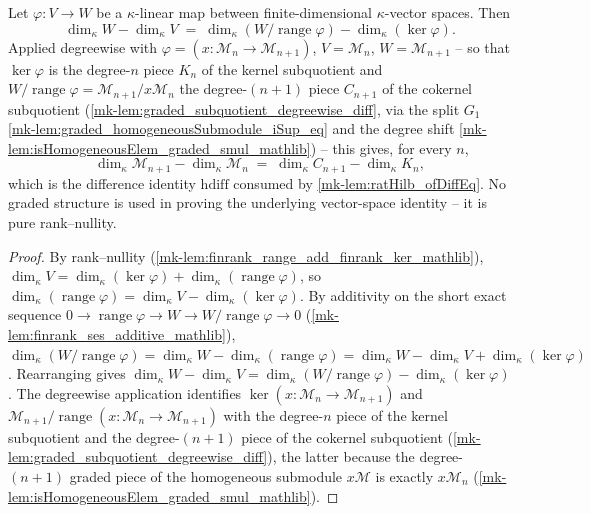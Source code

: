 \begin{lemma}\label{mk-lem:graded_degreewise_finrank_diff}
  \leanok

  Let \(\varphi : V \to W\) be a \(\kappa\)-linear map between finite-dimensional
  \(\kappa\)-vector spaces. Then
  \[
    \dim_\kappa W - \dim_\kappa V
      \;=\; \dim_\kappa(W/\operatorname{range}\varphi) - \dim_\kappa(\ker\varphi).
  \]
  Applied degreewise with \(\varphi = (x : \mathcal{M}_n \to \mathcal{M}_{n+1})\),
  \(V = \mathcal{M}_n\), \(W = \mathcal{M}_{n+1}\) -- so that \(\ker\varphi\) is the
  degree-\(n\) piece \(K_n\) of the kernel subquotient and
  \(W/\operatorname{range}\varphi = \mathcal{M}_{n+1}/x \mathcal{M}_n\) the
  degree-\((n+1)\) piece \(C_{n+1}\) of the cokernel subquotient
  (\ref{mk-lem:graded_subquotient_degreewise_diff}, via the split \(G_1\)
  \ref{mk-lem:graded_homogeneousSubmodule_iSup_eq} and the degree shift
  \ref{mk-lem:isHomogeneousElem_graded_smul_mathlib}) -- this gives, for every \(n\),
  \[
    \dim_\kappa \mathcal{M}_{n+1} - \dim_\kappa \mathcal{M}_n
      \;=\; \dim_\kappa C_{n+1} - \dim_\kappa K_n,
  \]
  which is the difference identity \(\mathrm{hdiff}\) consumed by
  \ref{mk-lem:ratHilb_ofDiffEq}. No graded structure is used in proving the
  underlying vector-space identity -- it is pure rank--nullity.
\end{lemma}

\begin{proof}
  \leanok
    By rank--nullity (\ref{mk-lem:finrank_range_add_finrank_ker_mathlib}),
  \(\dim_\kappa V = \dim_\kappa(\ker\varphi) + \dim_\kappa(\operatorname{range}
  \varphi)\), so \(\dim_\kappa(\operatorname{range}\varphi) = \dim_\kappa V -
  \dim_\kappa(\ker\varphi)\). By additivity on the short exact sequence
  \(0 \to \operatorname{range}\varphi \to W \to W/\operatorname{range}\varphi \to 0\)
  (\ref{mk-lem:finrank_ses_additive_mathlib}),
  \(\dim_\kappa(W/\operatorname{range}\varphi) = \dim_\kappa W -
  \dim_\kappa(\operatorname{range}\varphi) = \dim_\kappa W - \dim_\kappa V +
  \dim_\kappa(\ker\varphi)\). Rearranging gives
  \(\dim_\kappa W - \dim_\kappa V = \dim_\kappa(W/\operatorname{range}\varphi) -
  \dim_\kappa(\ker\varphi)\). The degreewise application identifies
  \(\ker(x : \mathcal{M}_n \to \mathcal{M}_{n+1})\) and
  \(\mathcal{M}_{n+1}/\operatorname{range}(x : \mathcal{M}_n \to \mathcal{M}_{n+1})\)
  with the degree-\(n\) piece of the kernel subquotient and the degree-\((n+1)\)
  piece of the cokernel subquotient (\ref{mk-lem:graded_subquotient_degreewise_diff}),
  the latter because the degree-\((n+1)\) graded piece of the homogeneous submodule
  \(x\mathcal{M}\) is exactly \(x \mathcal{M}_n\)
  (\ref{mk-lem:isHomogeneousElem_graded_smul_mathlib}).
\end{proof}

